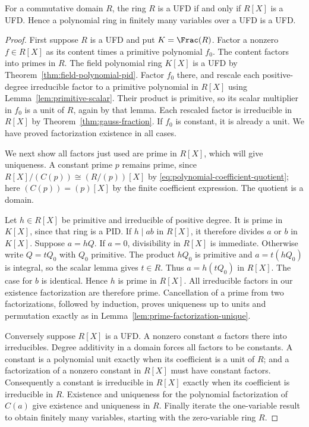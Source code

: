 \begin{theorem}\label{thm:polynomial-ufd}
For a commutative domain $R$, the ring $R$ is a UFD if and only if
$R[X]$ is a UFD. Hence a polynomial ring in finitely many variables
over a UFD is a UFD.
\end{theorem}
\begin{proof}
First suppose $R$ is a UFD and put $K=\Frac(R)$.
Factor a nonzero $f\in R[X]$ as its content times a primitive
polynomial $f_0$. The content factors into primes in $R$.
The field polynomial ring $K[X]$ is a UFD by
Theorem~\ref{thm:field-polynomial-pid}. Factor $f_0$ there, and
rescale each positive-degree irreducible factor to a primitive
polynomial in $R[X]$ using Lemma~\ref{lem:primitive-scalar}.
Their product is primitive, so its scalar multiplier in $f_0$ is a
unit of $R$, again by that lemma. Each rescaled factor is irreducible
in $R[X]$ by Theorem~\ref{thm:gauss-fraction}. If $f_0$ is constant,
it is already a unit. We have proved factorization existence in all
cases.

We next show all factors just used are prime in $R[X]$, which will
give uniqueness. A constant prime $p$ remains prime, since
$R[X]/(C(p))\cong(R/(p))[X]$ by
\eqref{eq:polynomial-coefficient-quotient}; here $(C(p))=(p)[X]$
by the finite coefficient expression. The quotient is a domain.

Let $h\in R[X]$ be primitive and irreducible of positive degree.
It is prime in $K[X]$, since that ring is a PID. If $h\mid ab$
in $R[X]$, it therefore divides $a$ or $b$ in $K[X]$.
Suppose $a=hQ$. If $a=0$, divisibility in $R[X]$ is immediate.
Otherwise write $Q=tQ_0$ with $Q_0$ primitive. The product
$hQ_0$ is primitive and $a=t(hQ_0)$ is integral, so the scalar
lemma gives $t\in R$. Thus $a=h(tQ_0)$ in $R[X]$.
The case for $b$ is identical. Hence $h$ is prime in $R[X]$.
All irreducible factors in our existence factorization are therefore
prime. Cancellation of a prime from two factorizations, followed by
induction, proves uniqueness up to units and permutation exactly as
in Lemma~\ref{lem:prime-factorization-unique}.

Conversely suppose $R[X]$ is a UFD. A nonzero constant $a$ factors
there into irreducibles. Degree additivity in a domain forces all
factors to be constants. A constant is a polynomial unit exactly
when its coefficient is a unit of $R$; and a factorization of a
nonzero constant in $R[X]$ must have constant factors. Consequently
a constant is irreducible in $R[X]$ exactly when its coefficient
is irreducible in $R$. Existence and uniqueness for the polynomial
factorization of $C(a)$ give existence and uniqueness in $R$.
Finally iterate the one-variable result to obtain finitely many
variables, starting with the zero-variable ring $R$.
\end{proof}

